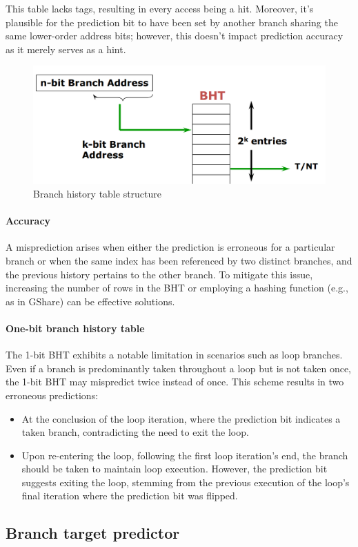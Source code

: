 This table lacks tags, resulting in every access being a hit. 
Moreover, it's plausible for the prediction bit to have been set by another branch sharing the same lower-order address bits; however, this doesn't impact prediction accuracy as it merely serves as a hint.
\begin{figure}[H]
    \centering
    \includegraphics[width=0.5\linewidth]{images/bht.png}
    \caption{Branch history table structure}
\end{figure}
\paragraph*{Accuracy}
A misprediction arises when either the prediction is erroneous for a particular branch or when the same index has been referenced by two distinct branches, and the previous history pertains to the other branch.
To mitigate this issue, increasing the number of rows in the BHT or employing a hashing function (e.g., as in GShare) can be effective solutions.

\paragraph*{One-bit branch history table}
The 1-bit BHT exhibits a notable limitation in scenarios such as loop branches. 
Even if a branch is predominantly taken throughout a loop but is not taken once, the 1-bit BHT may mispredict twice instead of once.
This scheme results in two erroneous predictions:
\begin{itemize}
    \item At the conclusion of the loop iteration, where the prediction bit indicates a taken branch, contradicting the need to exit the loop.
    \item Upon re-entering the loop, following the first loop iteration's end, the branch should be taken to maintain loop execution. 
        However, the prediction bit suggests exiting the loop, stemming from the previous execution of the loop's final iteration where the prediction bit was flipped.
\end{itemize}

\subsection{Branch target predictor}
